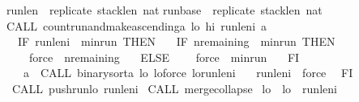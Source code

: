 \begin{isabellebody}
{\isasymacute}run{\isacharunderscore}len\ {\isacharcolon}{\isacharequal}{\isacharequal}\ replicate\ {\isasymacute}stack{\isacharunderscore}len\ {\isacharparenleft}{}{\isacharcolon}{\isacharcolon}nat{\isacharparenright}{\isacharsemicolon}{\isacharsemicolon}\isanewline
{\isasymacute}run{\isacharunderscore}base\ {\isacharcolon}{\isacharequal}{\isacharequal}\ replicate\ {\isasymacute}stack{\isacharunderscore}len\ {\isacharparenleft}{}{\isacharcolon}{\isacharcolon}nat{\isacharparenright}{\isacharsemicolon}{\isacharsemicolon}\isanewline
CALL\ count{\isacharunderscore}run{\isacharunderscore}and{\isacharunderscore}make{\isacharunderscore}ascending{\isacharparenleft}{\isasymacute}a{\isacharcomma}\ {\isasymacute}lo{\isacharcomma}\ {\isasymacute}hi{\isacharcomma}\ {\isasymacute}run{\isacharunderscore}len{\isacharunderscore}i{\isacharcomma}\ {\isasymacute}a{\isacharparenright}{\isacharsemicolon}{\isacharsemicolon}\isanewline
\ \ IF\ {\isasymacute}run{\isacharunderscore}len{\isacharunderscore}i\ {\isacharless}\ {\isasymacute}min{\isacharunderscore}run\ THEN\isanewline
\ \ \ IF\ {\isasymacute}n{\isacharunderscore}remaining\ {\isasymle}\ {\isasymacute}min{\isacharunderscore}run\ THEN\isanewline
\ \ \ \ {\isasymacute}force\ {\isacharcolon}{\isacharequal}{\isacharequal}\ {\isasymacute}n{\isacharunderscore}remaining\isanewline
\ \ \ ELSE\isanewline
\ \ \ \ {\isasymacute}force\ {\isacharcolon}{\isacharequal}{\isacharequal}\ {\isasymacute}min{\isacharunderscore}run\isanewline
\ \ \ FI{\isacharsemicolon}{\isacharsemicolon}\isanewline
\ \ \ {\isasymacute}a\ {\isacharcolon}{\isacharequal}{\isacharequal}\ CALL\ binary{\isacharunderscore}sort{\isacharparenleft}{\isasymacute}a{\isacharcomma}\ {\isasymacute}lo{\isacharcomma}\ {\isasymacute}lo{\isacharplus}{\isasymacute}force{\isacharcomma}\ {\isasymacute}lo{\isacharplus}{\isasymacute}run{\isacharunderscore}len{\isacharunderscore}i{\isacharparenright}{\isacharsemicolon}{\isacharsemicolon}\isanewline
\ \ \ {\isasymacute}run{\isacharunderscore}len{\isacharunderscore}i\ {\isacharcolon}{\isacharequal}{\isacharequal}\ {\isasymacute}force\isanewline
\ \ FI{\isacharsemicolon}{\isacharsemicolon}\isanewline
\ CALL\ push{\isacharunderscore}run{\isacharparenleft}{\isasymacute}lo{\isacharcomma}\ {\isasymacute}run{\isacharunderscore}len{\isacharunderscore}i{\isacharparenright}{\isacharsemicolon}{\isacharsemicolon}\isanewline
\ CALL\ merge{\isacharunderscore}collapse{\isacharparenleft}{\isacharparenright}{\isacharsemicolon}{\isacharsemicolon}\isanewline
\ {\isasymacute}lo\ {\isacharcolon}{\isacharequal}{\isacharequal}\ {\isasymacute}lo\ {\isacharplus}\ {\isasymacute}run{\isacharunderscore}len{\isacharunderscore}i{\isacharsemicolon}{\isacharsemicolon}\isanewline

\end{isabellebody}
